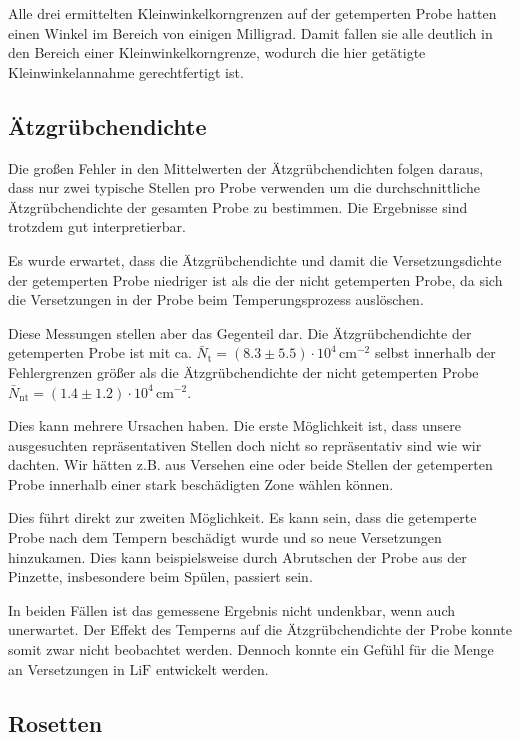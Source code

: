 \documentclass[12pt,a4paper]{scrartcl}
\numberwithin{equation}{section} %
\begin{document}
Alle drei ermittelten Kleinwinkelkorngrenzen auf der getemperten Probe
hatten einen Winkel im Bereich von einigen Milligrad. Damit fallen sie
alle deutlich in den Bereich einer Kleinwinkelkorngrenze, wodurch die
hier getätigte Kleinwinkelannahme gerechtfertigt ist.

\hypertarget{uxe4tzgruxfcbchendichte-1}{%
\subsection{Ätzgrübchendichte}\label{uxe4tzgruxfcbchendichte-1}}

Die großen Fehler in den Mittelwerten der Ätzgrübchendichten folgen
daraus, dass nur zwei typische Stellen pro Probe verwenden um die
durchschnittliche Ätzgrübchendichte der gesamten Probe zu bestimmen. Die
Ergebnisse sind trotzdem gut interpretierbar.

Es wurde erwartet, dass die Ätzgrübchendichte und damit die
Versetzungsdichte der getemperten Probe niedriger ist als die der nicht
getemperten Probe, da sich die Versetzungen in der Probe beim
Temperungsprozess auslöschen. \cite{Newey}

Diese Messungen stellen aber das Gegenteil dar. Die Ätzgrübchendichte
der getemperten Probe ist mit ca.
$\bar N_\mathrm{t}=(8.3\pm 5.5) \cdot 10^4 \mathrm{\, cm^{-2}}$ selbst
innerhalb der Fehlergrenzen größer als die Ätzgrübchendichte der nicht
getemperten Probe
$\bar N_\mathrm{nt}=(1.4 \pm 1.2) \cdot 10^4 \mathrm{\, cm^{-2}}$.

Dies kann mehrere Ursachen haben. Die erste Möglichkeit ist, dass unsere
ausgesuchten repräsentativen Stellen doch nicht so repräsentativ sind
wie wir dachten. Wir hätten z.B. aus Versehen eine oder beide Stellen
der getemperten Probe innerhalb einer stark beschädigten Zone wählen
können.

Dies führt direkt zur zweiten Möglichkeit. Es kann sein, dass die
getemperte Probe nach dem Tempern beschädigt wurde und so neue
Versetzungen hinzukamen. Dies kann beispielsweise durch Abrutschen der
Probe aus der Pinzette, insbesondere beim Spülen, passiert sein.

In beiden Fällen ist das gemessene Ergebnis nicht undenkbar, wenn auch
unerwartet. Der Effekt des Temperns auf die Ätzgrübchendichte der Probe
konnte somit zwar nicht beobachtet werden. Dennoch konnte ein Gefühl für
die Menge an Versetzungen in $\mathrm{LiF}$ entwickelt werden.

\hypertarget{rosetten}{%
\subsection{Rosetten}\label{rosetten}}
\end{document}

